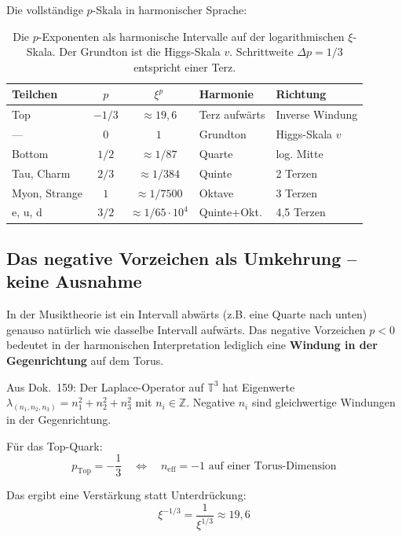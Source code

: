 Die vollständige $p$-Skala in harmonischer Sprache:

\begin{table}[htbp]
\centering\small
\begin{tabular}{lccll}
\toprule
\textbf{Teilchen} & $p$ & \textbf{$\xi^p$} & \textbf{Harmonie} & \textbf{Richtung} \\
\midrule
Top     & $-1/3$ & ${\approx}19{,}6$ & Terz aufwärts  & Inverse Windung \\
---     & $0$    & $1$               & Grundton       & Higgs-Skala $v$ \\
Bottom  & $1/2$  & ${\approx}1/87$   & Quarte         & log. Mitte \\
Tau, Charm & $2/3$ & ${\approx}1/384$ & Quinte        & 2 Terzen \\
Myon, Strange & $1$ & ${\approx}1/7500$ & Oktave      & 3 Terzen \\
e, u, d & $3/2$  & ${\approx}1/65{\cdot}10^4$ & Quinte+Okt. & 4,5 Terzen \\
\bottomrule
\end{tabular}
\caption{Die $p$-Exponenten als harmonische Intervalle auf der
logarithmischen $\xi$-Skala. Der Grundton ist die Higgs-Skala $v$.
Schrittweite $\Delta p = 1/3$ entspricht einer Terz.}
\label{tab:harmonisch}
\end{table}

\subsection{Das negative Vorzeichen als Umkehrung -- keine Ausnahme}

In der Musiktheorie ist ein Intervall abwärts (z.B. eine Quarte nach
unten) genauso natürlich wie dasselbe Intervall aufwärts. Das
negative Vorzeichen $p < 0$ bedeutet in der harmonischen Interpretation
lediglich eine \textbf{Windung in der Gegenrichtung} auf dem Torus.

Aus Dok.~159: Der Laplace-Operator auf $\mathbb{T}^3$ hat Eigenwerte
$\lambda_{(n_1,n_2,n_3)} = n_1^2 + n_2^2 + n_3^2$ mit
$n_i \in \mathbb{Z}$. Negative $n_i$ sind gleichwertige Windungen
in der Gegenrichtung.

Für das Top-Quark:
\begin{equation}
    p_{\text{Top}} = -\frac{1}{3}
    \quad \Longleftrightarrow \quad
    n_{\text{eff}} = -1 \text{ auf einer Torus-Dimension}
\end{equation}

Das ergibt eine Verstärkung statt Unterdrückung:
\begin{equation}
    \xi^{-1/3} = \frac{1}{\xi^{1/3}} \approx 19{,}6
\end{equation}

